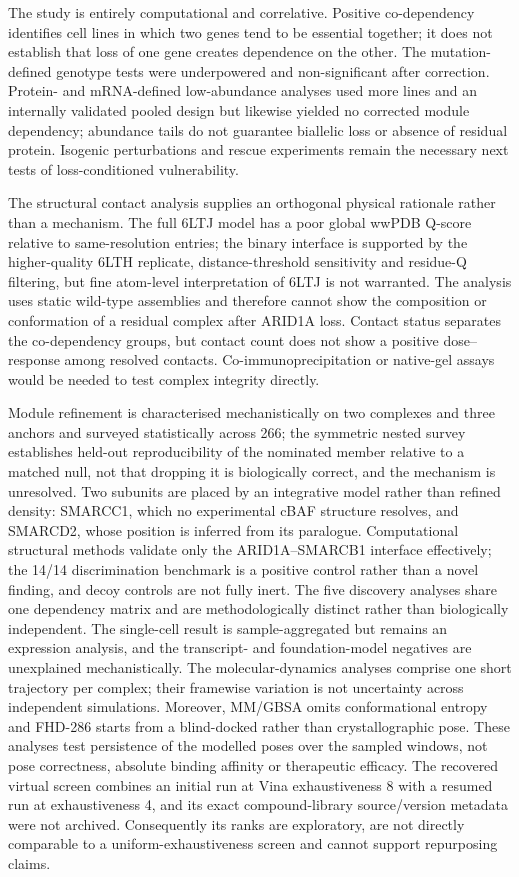 \documentclass[11pt,a4paper]{article}
\begin{document}
The study is entirely computational and correlative. Positive co-dependency
identifies cell lines in which two genes tend to be essential together; it does
not establish that loss of one gene creates dependence on the other. The
mutation-defined genotype tests were underpowered and non-significant after
correction. Protein- and mRNA-defined low-abundance analyses used more lines and
an internally validated pooled design but likewise yielded no corrected module
dependency; abundance tails do not guarantee biallelic loss or absence of
residual protein. Isogenic perturbations and rescue experiments remain the
necessary next tests of loss-conditioned vulnerability.

The structural contact analysis supplies an orthogonal physical rationale rather
than a mechanism. The full 6LTJ model has a poor global wwPDB Q-score relative
to same-resolution entries; the binary interface is supported by the
higher-quality 6LTH replicate, distance-threshold sensitivity and residue-Q
filtering, but fine atom-level interpretation of 6LTJ is not warranted. The
analysis uses static wild-type assemblies and therefore cannot show
the composition or conformation of a residual complex after ARID1A loss. Contact
status separates the co-dependency groups, but contact count does not show a
positive dose--response among resolved contacts. Co-immunoprecipitation or
native-gel assays would be needed to test complex integrity directly.

Module refinement is characterised mechanistically on two complexes and three
anchors and surveyed statistically across 266; the symmetric nested survey
establishes held-out reproducibility of the nominated member relative to a
matched null, not that dropping it is biologically correct, and the mechanism is
unresolved.
Two subunits are placed by an integrative model rather than refined density:
SMARCC1, which no experimental cBAF structure resolves, and SMARCD2, whose
position is inferred from its paralogue. Computational structural methods
validate only the ARID1A--SMARCB1 interface effectively; the 14/14 discrimination
benchmark is a positive control rather than a novel finding, and decoy controls
are not fully inert. The five discovery analyses share one dependency matrix and
are methodologically distinct rather than biologically independent. The
single-cell result is sample-aggregated but remains an expression analysis, and
the transcript- and foundation-model negatives are unexplained mechanistically.
The molecular-dynamics analyses comprise one short trajectory per complex;
their framewise variation is not uncertainty across independent simulations.
Moreover, MM/GBSA omits conformational entropy and FHD-286 starts from a
blind-docked rather than crystallographic pose. These analyses test persistence
of the modelled poses over the sampled windows, not pose correctness, absolute
binding affinity or therapeutic efficacy. The recovered virtual screen combines
an initial run at Vina exhaustiveness 8 with a resumed run at exhaustiveness 4,
and its exact compound-library source/version metadata were not archived.
Consequently its ranks are exploratory, are not directly comparable to a
uniform-exhaustiveness screen and cannot support repurposing claims.
\end{document}
